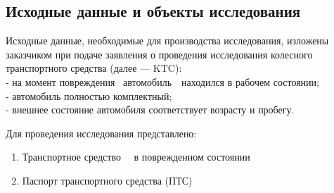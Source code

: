 \setcounter{page}{1}



\def\итог{47426}
\def\итогизнос{47426}
\def\рынок{1000000}
\def\нормочас{930}

\subsection{Исходные данные и объекты исследования} 
Исходные  данные,  необходимые  для производства  исследования,  изложены   заказчиком при подаче заявления о проведения исследования   колесного  транспортного  средства (далее —  KTC):\\
- на момент повреждения \, автомобиль \,\, находился в рабочем состоянии;\\
- автомобиль полностью комплектный;\\
- внешнее состояние автомобиля соответствует возрасту и пробегу.
   

	Для проведения исследования представлено:\\
\begin{enumerate}
\item Транспортное средство \,  \, в поврежденном состоянии
\item Паспорт транспортного средства (ПТС) 
	\end{enumerate}
%
%
%
